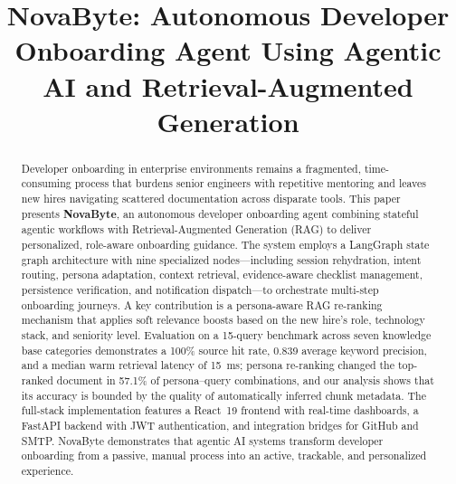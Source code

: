 \documentclass[conference]{IEEEtran}
\begin{document}
\title{NovaByte: Autonomous Developer Onboarding Agent Using Agentic AI and Retrieval-Augmented Generation}

\author{
}

\maketitle

\begin{abstract}
Developer onboarding in enterprise environments remains a fragmented, time-consuming process that burdens senior engineers with repetitive mentoring and leaves new hires navigating scattered documentation across disparate tools. This paper presents \textbf{NovaByte}, an autonomous developer onboarding agent combining stateful agentic workflows with Retrieval-Augmented Generation (RAG) to deliver personalized, role-aware onboarding guidance. The system employs a LangGraph state graph architecture with nine specialized nodes---including session rehydration, intent routing, persona adaptation, context retrieval, evidence-aware checklist management, persistence verification, and notification dispatch---to orchestrate multi-step onboarding journeys. A key contribution is a persona-aware RAG re-ranking mechanism that applies soft relevance boosts based on the new hire's role, technology stack, and seniority level. Evaluation on a 15-query benchmark across seven knowledge base categories demonstrates a 100\% source hit rate, 0.839 average keyword precision, and a median warm retrieval latency of 15~ms; persona re-ranking changed the top-ranked document in 57.1\% of persona--query combinations, and our analysis shows that its accuracy is bounded by the quality of automatically inferred chunk metadata. The full-stack implementation features a React~19 frontend with real-time dashboards, a FastAPI backend with JWT authentication, and integration bridges for GitHub and SMTP. NovaByte demonstrates that agentic AI systems transform developer onboarding from a passive, manual process into an active, trackable, and personalized experience.
\end{abstract}
\end{document}
